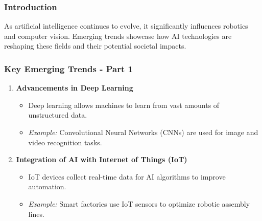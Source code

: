 \documentclass[aspectratio=169]{beamer}
\begin{document}
\begin{frame}[fragile]
    \frametitle{Introduction}
    As artificial intelligence continues to evolve, it significantly influences robotics and computer vision. 
    Emerging trends showcase how AI technologies are reshaping these fields and their potential societal impacts.
\end{frame}

\begin{frame}[fragile]
    \frametitle{Key Emerging Trends - Part 1}
    \begin{enumerate}
        \item \textbf{Advancements in Deep Learning}
        \begin{itemize}
            \item Deep learning allows machines to learn from vast amounts of unstructured data.
            \item \textit{Example:} Convolutional Neural Networks (CNNs) are used for image and video recognition tasks.
        \end{itemize}
        
        \item \textbf{Integration of AI with Internet of Things (IoT)}
        \begin{itemize}
            \item IoT devices collect real-time data for AI algorithms to improve automation.
            \item \textit{Example:} Smart factories use IoT sensors to optimize robotic assembly lines.
        \end{itemize}
    \end{enumerate}
\end{frame}
\end{document}
